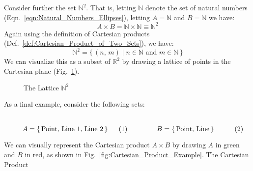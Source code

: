         Consider further the set $\mathbb{N}^{2}$. That is, letting
        $\mathbb{N}$ denote the set of natural numbers
        (Eqn.~\ref{eqn:Natural_Numbers_Ellipses}), letting $A=\mathbb{N}$ and
        $B=\mathbb{N}$ we have:
        \begin{equation}
            A\times{B}=\mathbb{N}\times\mathbb{N}\equiv\mathbb{N}^{2}
        \end{equation}
        Again using the definition of Cartesian products
        (Def.~\ref{def:Cartesian_Product_of_Two_Sets}), we have:
        \begin{equation}
            \mathbb{N}^{2}=
            \{\,(n,\,m)\;|\;n\in\mathbb{N}\textrm{ and }m\in\mathbb{N}\,\}
        \end{equation}
        We can visualize this as a subset of $\mathbb{R}^{2}$ by drawing a
        lattice of points in the Cartesian plane
        (Fig.~\ref{fig:Lattice_Cart_Prod_of_N_with_N}).
        \begin{figure}[H]
            \centering
            
            \caption{The Lattice $\mathbb{N}^{2}$}
            \label{fig:Lattice_Cart_Prod_of_N_with_N}
        \end{figure}
        As a final example, consider the following sets:
        \par
        \begin{subequations}
            \begin{minipage}[b]{0.49\textwidth}
                \centering
                \begin{equation}
                    A=\{\,\textrm{Point, Line 1, Line 2}\,\}
                \end{equation}
            \end{minipage}
            \hfill
            \begin{minipage}[b]{0.49\textwidth}
                \centering
                \begin{equation}
                    B=\{\,\textrm{Point, Line}\,\}
                \end{equation}
            \end{minipage}
        \end{subequations}
        \par\vspace{2.5ex}
        We can visually represent the Cartesian product $A\times{B}$ by
        drawing $A$ in green and $B$ in red, as shown in
        Fig.~\ref{fig:Cartesian_Product_Example}. The Cartesian Product
